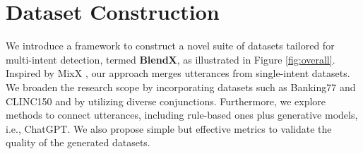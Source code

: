 \section{Dataset Construction}
\label{sec:dataset_construction}

We introduce a framework to construct a novel suite of datasets tailored for multi-intent detection, termed \textbf{BlendX}, as illustrated in Figure \ref{fig:overall}. 
Inspired by MixX , our approach merges utterances from single-intent datasets. 
We broaden the research scope by incorporating datasets such as Banking77 and CLINC150 and by utilizing diverse conjunctions. 
Furthermore, we explore methods to connect utterances, including rule-based ones plus generative models, i.e., ChatGPT.
We also propose simple but effective metrics to validate the quality of the generated datasets.




